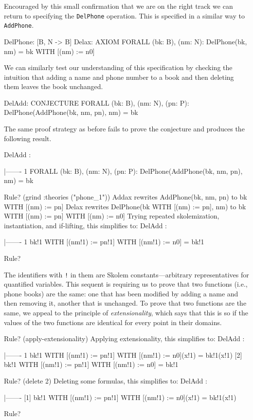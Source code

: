 Encouraged by this small confirmation that we are on the right track
we can return to specifying the {\tt DelPhone} operation.  This is
specified in a similar way to {\tt AddPhone}.
\begin{pvsexample}
DelPhone: [B, N -> B]
Delax: AXIOM   FORALL (bk: B), (nm: N): DelPhone(bk, nm) = bk WITH [(nm) := n0]
\end{pvsexample}
We can similarly test our understanding of this specification by
checking the intuition that adding a name and phone number to a book
and then deleting them leaves the book unchanged.
\begin{pvsexample}
DelAdd: CONJECTURE  FORALL (bk: B), (nm: N), (pn: P):
  DelPhone(AddPhone(bk, nm, pn), nm) = bk
\end{pvsexample}
The same proof strategy as before fails to prove the conjecture and
produces the following result.
\begin{pvsexample}
DelAdd :  

  |-------
{1}   FORALL (bk: B), (nm: N), (pn: P): DelPhone(AddPhone(bk, nm, pn), nm) = bk

Rule? (grind :theories ("phone_1"))
Addax rewrites AddPhone(bk, nm, pn)
  to bk WITH [(nm) := pn]
Delax rewrites DelPhone(bk WITH [(nm) := pn], nm)
  to bk WITH [(nm) := pn] WITH [(nm) := n0]
Trying repeated skolemization, instantiation, and if-lifting, this simplifies to: 
DelAdd :  

  |-------
{1}   bk!1 WITH [(nm!1) := pn!1] WITH [(nm!1) := n0] = bk!1

Rule?
\end{pvsexample}
The identifiers with {\tt !} in them are Skolem constants---arbitrary
representatives for quantified variables.  This sequent is requiring
us to prove that two functions (i.e., phone books) are the same: one
that has been modified by adding a name and then removing it, another
that is unchanged.  To prove that two functions are the same, we
appeal to the principle of {\em extensionality\/}, which says that
this is so if the values of the two functions are identical for every
point in their domains.
\begin{pvsexample}
Rule? (apply-extensionality)
  Applying extensionality, this simplifies to: 
DelAdd :  

  |-------
{1}   bk!1 WITH [(nm!1) := pn!1] WITH [(nm!1) := n0](x!1) = bk!1(x!1)
[2]   bk!1 WITH [(nm!1) := pn!1] WITH [(nm!1) := n0] = bk!1

Rule? (delete 2)
  Deleting some formulas, this simplifies to: 
DelAdd :  

  |-------
[1]   bk!1 WITH [(nm!1) := pn!1] WITH [(nm!1) := n0](x!1) = bk!1(x!1)

Rule? 
\end{pvsexample}
